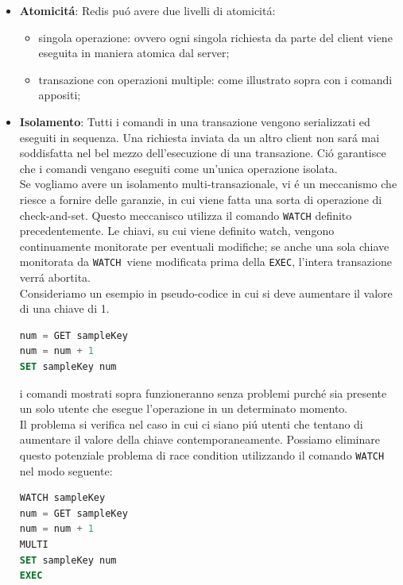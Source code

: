 \begin{itemize}
    \item \textbf{Atomicitá}: Redis puó avere due livelli di atomicitá:
      \begin{itemize}
          \item singola operazione: ovvero ogni singola richiesta da parte del client viene eseguita in maniera atomica dal server;
          \item transazione con operazioni multiple: come illustrato sopra con i comandi appositi;
      \end{itemize}

    \item \textbf{Isolamento}:
    Tutti i comandi in una transazione vengono serializzati ed eseguiti in sequenza. Una richiesta inviata da un altro client
    non sará mai soddisfatta nel bel mezzo dell'esecuzione di una transazione. Ció garantisce che i comandi vengano eseguiti
    come un'unica operazione isolata.\\
    Se vogliamo avere un isolamento multi-transazionale, vi é un meccanismo che riesce a fornire delle garanzie, in cui viene fatta una sorta di operazione
    di check-and-set.
    Questo meccanisco utilizza il comando \texttt{WATCH} definito precedentemente.
    Le chiavi, su cui viene definito watch, vengono continuamente monitorate per eventuali modifiche; se anche una sola chiave monitorata
    da \texttt{WATCH }viene modificata prima della \texttt{EXEC}, l'intera transazione verrá abortita.\\

    Consideriamo un esempio in pseudo-codice in cui si deve aumentare il valore di una chiave di 1.

    \begin{lstlisting}[autogobble, style=redis-cli, language=SQL]
num = GET sampleKey
num = num + 1
SET sampleKey num\end{lstlisting}

    i comandi mostrati sopra funzioneranno senza problemi purché sia presente un solo utente che esegue l'operazione in un determinato momento.\\
    Il problema si verifica nel caso in cui ci siano piú utenti che tentano di aumentare il valore della chiave contemporaneamente.
    Possiamo eliminare questo potenziale problema di race condition utilizzando il comando \texttt{WATCH} nel modo seguente:

    \begin{lstlisting}[autogobble, style=redis-cli, language=SQL]
WATCH sampleKey
num = GET sampleKey
num = num + 1
MULTI
SET sampleKey num
EXEC\end{lstlisting}


\end{itemize}
